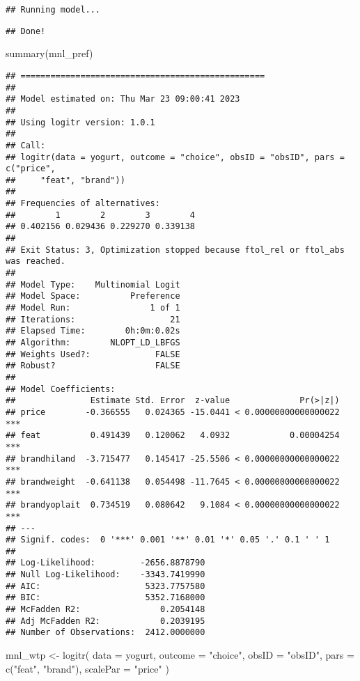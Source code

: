 \documentclass[
]{article}
\newenvironment{Shaded}{\begin{snugshade}}{\end{snugshade}}
\newcommand{\AttributeTok}[1]{\textcolor[rgb]{0.77,0.63,0.00}{#1}}
\newcommand{\FunctionTok}[1]{\textcolor[rgb]{0.00,0.00,0.00}{#1}}
\newcommand{\NormalTok}[1]{#1}
\newcommand{\OtherTok}[1]{\textcolor[rgb]{0.56,0.35,0.01}{#1}}
\newcommand{\StringTok}[1]{\textcolor[rgb]{0.31,0.60,0.02}{#1}}
\begin{document}
\begin{verbatim}
## Running model...
\end{verbatim}

\begin{verbatim}
## Done!
\end{verbatim}

\begin{Shaded}
\begin{Highlighting}[]
\FunctionTok{summary}\NormalTok{(mnl\_pref)}
\end{Highlighting}
\end{Shaded}

\begin{verbatim}
## =================================================
## 
## Model estimated on: Thu Mar 23 09:00:41 2023 
## 
## Using logitr version: 1.0.1 
## 
## Call:
## logitr(data = yogurt, outcome = "choice", obsID = "obsID", pars = c("price", 
##     "feat", "brand"))
## 
## Frequencies of alternatives:
##        1        2        3        4 
## 0.402156 0.029436 0.229270 0.339138 
## 
## Exit Status: 3, Optimization stopped because ftol_rel or ftol_abs was reached.
##                                 
## Model Type:    Multinomial Logit
## Model Space:          Preference
## Model Run:                1 of 1
## Iterations:                   21
## Elapsed Time:        0h:0m:0.02s
## Algorithm:        NLOPT_LD_LBFGS
## Weights Used?:             FALSE
## Robust?                    FALSE
## 
## Model Coefficients: 
##               Estimate Std. Error  z-value              Pr(>|z|)    
## price        -0.366555   0.024365 -15.0441 < 0.00000000000000022 ***
## feat          0.491439   0.120062   4.0932            0.00004254 ***
## brandhiland  -3.715477   0.145417 -25.5506 < 0.00000000000000022 ***
## brandweight  -0.641138   0.054498 -11.7645 < 0.00000000000000022 ***
## brandyoplait  0.734519   0.080642   9.1084 < 0.00000000000000022 ***
## ---
## Signif. codes:  0 '***' 0.001 '**' 0.01 '*' 0.05 '.' 0.1 ' ' 1
##                                      
## Log-Likelihood:         -2656.8878790
## Null Log-Likelihood:    -3343.7419990
## AIC:                     5323.7757580
## BIC:                     5352.7168000
## McFadden R2:                0.2054148
## Adj McFadden R2:            0.2039195
## Number of Observations:  2412.0000000
\end{verbatim}

\begin{Shaded}
\begin{Highlighting}[]
\NormalTok{mnl\_wtp }\OtherTok{\textless{}{-}} \FunctionTok{logitr}\NormalTok{(}
    \AttributeTok{data     =}\NormalTok{ yogurt,}
    \AttributeTok{outcome  =} \StringTok{"choice"}\NormalTok{,}
    \AttributeTok{obsID    =} \StringTok{"obsID"}\NormalTok{,}
    \AttributeTok{pars     =} \FunctionTok{c}\NormalTok{(}\StringTok{"feat"}\NormalTok{, }
                \StringTok{"brand"}\NormalTok{),}
    \AttributeTok{scalePar =} \StringTok{"price"}
\NormalTok{)}
\end{Highlighting}
\end{Shaded}
\end{document}
